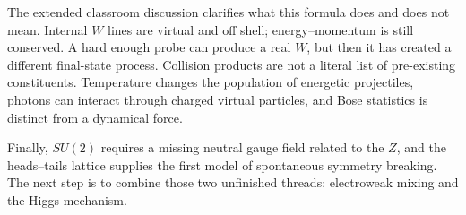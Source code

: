 The extended classroom discussion clarifies what this formula does and does
not mean. Internal \(W\) lines are virtual and off shell; energy--momentum is
still conserved. A hard enough probe can produce a real \(W\), but then it
has created a different final-state process. Collision products are not a
literal list of pre-existing constituents. Temperature changes the population
of energetic projectiles, photons can interact through charged virtual
particles, and Bose statistics is distinct from a dynamical force.

Finally, \(SU(2)\) requires a missing neutral gauge field related to the
\(Z\), and the heads--tails lattice supplies the first model of spontaneous
symmetry breaking. The next step is to combine those two unfinished threads:
electroweak mixing and the Higgs mechanism.
